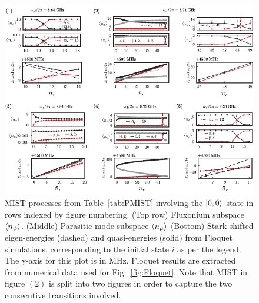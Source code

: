 \documentclass[%
reprint,
superscriptaddress,
 amsmath,amssymb,
 aps,
 prx,
longbibliography,
floatfix,
]{revtex4-2}
\newcommand{\sh}[1]{{\color{blue}{{}[SS: #1]}}}%
\begin{document}
\begin{figure}
    \centering
    \includegraphics[width=1.0\textwidth]{Supp_Fig/Trans0.pdf}
    \caption{MIST processes from Table~\ref{tab:PMIST} involving the $\ket{\tilde{0},\tilde{0}}$ state in rows indexed by figure numbering. (Top row) Fluxonium subspace $\braket{n_\phi}$. (Middle) Parasitic mode subspace $\braket{n_\mu}$ (Bottom) Stark-shifted eigen-energies (dashed) and quasi-energies (solid) from Floquet simulations, corresponding to the initial state $i$ as per the legend. The y-axis for this plot is in MHz. Floquet results are extracted from numerical data used for Fig.~\ref{fig:Floquet}. Note that MIST in figure $(2)$ is split into two figures in order to capture the two consecutive transitions involved.}
    \label{fig:Trans0}
\end{figure}
\end{document}
